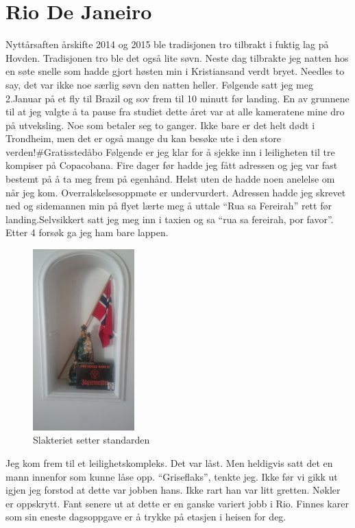 \section*{Rio De Janeiro}
Nyttårsaften årskifte 2014 og 2015 ble tradisjonen tro tilbrakt i
fuktig lag på Hovden. Tradisjonen tro ble det også lite søvn. Neste
dag tilbrakte jeg natten hos en søte snelle som hadde gjort høsten
min i Kristiansand verdt bryet. Needles to say, det var ikke noe
særlig søvn den natten heller. Følgende satt jeg meg 2.Januar på et
fly til Brazil og sov frem til 10 minutt før landing. 
En av grunnene til at jeg valgte å ta pause fra studiet dette året var
at alle kameratene mine dro på utveksling. Noe som betaler seg to
ganger. Ikke bare er det helt dødt i Trondheim, men det er også mange
du kan besøke ute i den store verden!\#Gratisstedåbo Følgende er jeg
klar for 
å sjekke inn i leiligheten til tre kompiser på Copacobana.
Fire dager før hadde jeg fått adressen og jeg var fast bestemt på å ta
meg frem på egenhånd. Helst uten de hadde noen anelelse om når jeg
kom. Overralskelsesoppmøte er undervurdert. Adressen hadde jeg skrevet
ned og sidemannen min på flyet lærte meg å uttale ``Rua sa Fereirah'' rett før
landing.Selvsikkert satt jeg meg inn i taxien og sa ``rua sa fereirah, por
favor''. Etter 4 forsøk ga jeg ham bare lappen.\\ 
\begin{figure}
	\begin{center}
		\includegraphics[width=0.35\textwidth]{slakteriet}
	\end{center}
	\caption{Slakteriet setter standarden}
\end{figure}
Jeg kom frem til et leilighetskompleks. Det var låst. Men heldigvis
satt det en mann innenfor som kunne låse opp. ``Griseflaks'', tenkte jeg.
Ikke før vi gikk ut igjen jeg forstod at dette var jobben hans. Ikke
rart han var litt gretten. Nøkler
er oppskrytt. Fant senere ut at dette er en ganske variert jobb i Rio.
Finnes karer som sin eneste dagsoppgave er å trykke på etasjen i
heisen for deg. 


